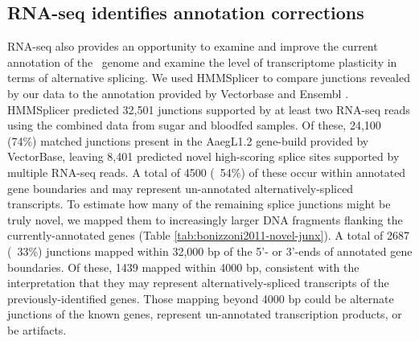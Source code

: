 \subsection{RNA-seq identifies annotation corrections}





RNA-seq also provides an opportunity to examine and improve the current annotation of the \Aa\  genome and examine the level of transcriptome plasticity in terms of alternative splicing. We used HMMSplicer \cite{Sieglaff2009} to compare junctions revealed by our data to the annotation provided by Vectorbase and Ensembl \cite{Lawson2009,Hubbard2002}. HMMSplicer predicted 32,501 junctions supported by at least two RNA-seq reads using the combined data from sugar and bloodfed samples. Of these, 24,100 (74\%) matched junctions present in the AaegL1.2 gene-build provided by VectorBase, leaving 8,401 predicted novel high-scoring splice sites supported by multiple RNA-seq reads. A total of 4500 (~54\%) of these occur within annotated gene boundaries and may represent un-annotated alternatively-spliced transcripts. To estimate how many of the remaining splice junctions might be truly novel, we mapped them to increasingly larger DNA fragments flanking the currently-annotated genes (Table \ref{tab:bonizzoni2011-novel-junx}). A total of 2687 (~33\%) junctions mapped within 32,000 bp of the 5'- or 3'-ends of annotated gene boundaries. Of these, 1439 mapped within 4000 bp, consistent with the interpretation that they may represent alternatively-spliced transcripts of the previously-identified genes. Those mapping beyond 4000 bp could be alternate junctions of the known genes, represent un-annotated transcription products, or be artifacts.


